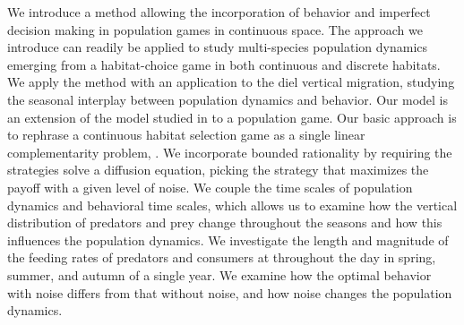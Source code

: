 We introduce a method allowing the incorporation of behavior and imperfect decision making in  population games in continuous space. The approach we introduce can readily be applied to study multi-species population dynamics emerging from a habitat-choice game in both continuous and discrete habitats. We apply the method with an application to the diel vertical migration, studying the seasonal interplay between population dynamics and behavior. Our model is an extension of the model studied in \citep{verticalmigration} to a population game. Our basic approach is to rephrase a continuous habitat selection game as a single linear complementarity problem, \citep{miller1991copositive}. We incorporate bounded rationality by requiring the strategies solve a diffusion equation, picking the strategy that maximizes the payoff with a given level of noise.
We couple the time scales of population dynamics and behavioral time scales, which allows us to examine how the vertical distribution of predators and prey change throughout the seasons and how this influences the population dynamics. We investigate the length and magnitude of the feeding rates of predators and consumers at throughout the day in spring, summer, and autumn of a single year. We examine how the optimal behavior with noise differs from that without noise, and how noise changes the population dynamics.

